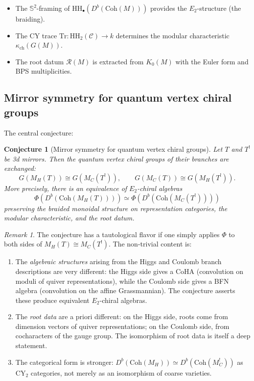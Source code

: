 \documentclass[11pt]{article}
\newtheorem{conjecture}[theorem]{Conjecture}
\theoremstyle{definition}
\theoremstyle{remark}
\newtheorem{remark}[theorem]{Remark}
\newcommand{\CY}{\mathrm{CY}}
\newcommand{\HH}{\mathrm{HH}}
\newcommand{\Coh}{\mathrm{Coh}}
\newcommand{\Tr}{\mathrm{Tr}}
\newcommand{\Etwo}{E_2}
\newcommand{\cC}{\mathcal{C}}
\begin{document}
\begin{itemize}
 \item The $\mathbb{S}^2$-framing of $\HH_\bullet(D^b(\Coh(M)))$ provides the $\Etwo$-structure (the braiding).
 \item The CY trace $\Tr \colon \HH_2(\cC) \to k$ determines the modular characteristic $\kappa_{\mathrm{ch}}(G(M))$.
 \item The root datum $\mathcal{R}(M)$ is extracted from $K_0(M)$ with the Euler form and BPS multiplicities.
\end{itemize}

\subsection{Mirror symmetry for quantum vertex chiral groups}

The central conjecture:

\begin{conjecture}[Mirror symmetry for quantum vertex chiral groups]
\label{conj:mirror-qvcg}
Let $T$ and $T^!$ be 3d mirrors. Then the quantum vertex chiral groups of their branches are exchanged:
\begin{equation}
\label{eq:mirror-qvcg}
 G(M_H(T)) \cong G(M_C(T^!)), \qquad G(M_C(T)) \cong G(M_H(T^!)).
\end{equation}
More precisely, there is an equivalence of $\Etwo$-chiral algebras
\[
 \Phi(D^b(\Coh(M_H(T)))) \simeq \Phi(D^b(\Coh(M_C(T^!))))
\]
preserving the braided monoidal structure on representation categories, the modular characteristic, and the root datum.
\end{conjecture}

\begin{remark}
The conjecture has a tautological flavor if one simply applies $\Phi$ to both sides of $M_H(T) \cong M_C(T^!)$. The non-trivial content is:
\begin{enumerate}[label=(\alph*)]
 \item The \emph{algebraic structures} arising from the Higgs and Coulomb branch descriptions are very different: the Higgs side gives a CoHA (convolution on moduli of quiver representations), while the Coulomb side gives a BFN algebra (convolution on the affine Grassmannian). The conjecture asserts these produce equivalent $\Etwo$-chiral algebras.
 \item The \emph{root data} are a priori different: on the Higgs side, roots come from dimension vectors of quiver representations; on the Coulomb side, from cocharacters of the gauge group. The isomorphism of root data is itself a deep statement.
 \item The categorical form is stronger: $D^b(\Coh(M_H)) \simeq D^b(\Coh(M_C^!))$ as $\CY_2$ categories, not merely as an isomorphism of coarse varieties.
\end{enumerate}
\end{remark}
\end{document}
